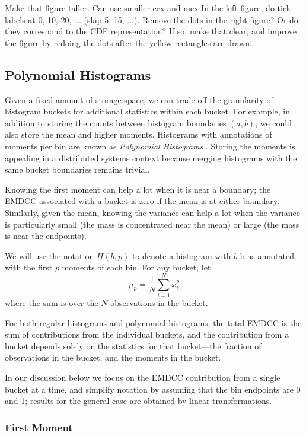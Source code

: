 \documentclass{article}
\newcommand{\TODO}[1]{{\color{red}{\bf TODO:} #1}}
\begin{document}
\TODO{Make that figure taller.
Can use smaller cex and mex
In the left figure, do tick labels at  0, 10, 20, ... (skip 5, 15, ...).
}
\TODO{Remove the dots in the right figure?
Or do they correspond to the CDF representation?
If so, make that clear, and improve the figure by redoing the dots after the
yellow rectangles are drawn.
}


\subsection{Polynomial Histograms}

Given a fixed amount of storage space, we can trade off the granularity of
histogram buckets for additional statistics within each bucket.  For example,
in addition to storing the counts between histogram boundaries $(a, b)$, we
could also store the mean and higher moments.  Histograms with
annotations of moments per bin are known as \emph{Polynomial
Histograms} \cite{sagae1997bin}.  Storing the moments is appealing in
a distributed systems context because merging histograms with the same
bucket boundaries remains trivial.

Knowing the first moment can help a lot when it is near a boundary; the
EMDCC associated with a bucket is zero if the mean is at either boundary.
Similarly, given the mean, knowing the variance can help a lot when
the variance is particularly small (the mass is concentrated near the mean)
or large (the mass is near the endpoints).

We will use the notation $H(b,p)$ to
denote a histogram with $b$ bins annotated with the first $p$ moments of
each bin.
For any bucket, let
\begin{equation}
   \mu_p = \frac{1}{N} \sum_{i=1}^N x_i^p
\end{equation}
where the sum is over the $N$ observations in the bucket.


For both regular histograms and polynomial histograms, the total EMDCC is
the sum of contributions from the individual buckets, and the contribution
from a bucket depends solely on the statistics for that bucket---the
fraction of observations in the bucket, and the moments in the bucket.

In our discussion below we focus on the EMDCC contribution from a single
bucket at a time,
and simplify notation by assuming that the bin endpoints are 0 and 1;
results for the general case are obtained by linear transformations.


\subsubsection{First Moment}
\end{document}
